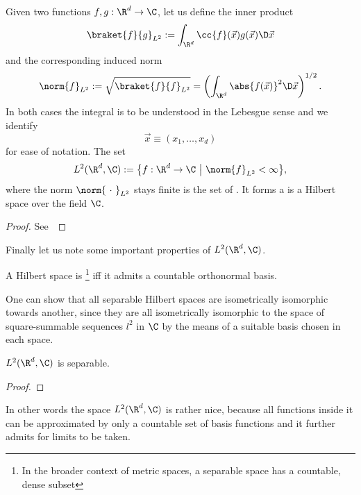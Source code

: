 \begin{prop}
	\label{prop:L2HilbertSpace}
	Given two functions $f, g : \R^d \to \C$,
	let us define the inner product
	\begin{equation}
		\braket{f}{g}_{L^2} := \int_{\R^d} \cc{f}(\vec{x}) g(\vec{x}) \D \vec{x}
		\label{eqn:defL2InnProd}
	\end{equation}
	and the corresponding induced norm
	\begin{equation}
		\norm{f}_{L^2} := \sqrt{\braket{f}{f}_{L^2}} = \left( \int_{\R^d} \abs{f(\vec{x})}^2 \D \vec{x} \right)^{1/2}.
		\label{eqn:defL2Norm}
	\end{equation}
	In both cases the integral is to be understood in the Lebesgue sense
	and we identify
	\[ \vec{x} \equiv (x_1, \ldots, x_d) \]
	for ease of notation. The set
	\[ L^2(\R^d, \C) := \big\{ f : \R^d \to \C ~\big|~ \norm{f}_{L^2} < \infty \big\}, \]
	where the norm $\norm{~\cdot~}_{L^2}$ stays finite
	is the set of .
	It forms a is a Hilbert space over the field $\C$.
	\begin{proof}
		See~\cite{Adams2003}
	\end{proof}
\end{prop}

Finally let us note some important properties of $L^2(\R^d, \C)$.

\begin{defn}
	A Hilbert space is %
	\footnote{In the broader context of metric spaces,
	a separable space has a countable, dense subset}
	iff it admits a countable orthonormal basis.
\end{defn}
One can show that all separable Hilbert spaces are
isometrically isomorphic towards another,
since they are all isometrically isomorphic to the space of
square-summable sequences $l^2$ in $\C$
by the means of a suitable basis chosen in each space.

\begin{prop}
	$L^2(\R^d, \C)$ is separable.
	\begin{proof}
	\end{proof}
\end{prop}

In other words the space $L^2(\R^d, \C)$ is rather nice,
because all functions inside it can be approximated
by only a countable set of basis functions
and it further admits for limits to be taken.

